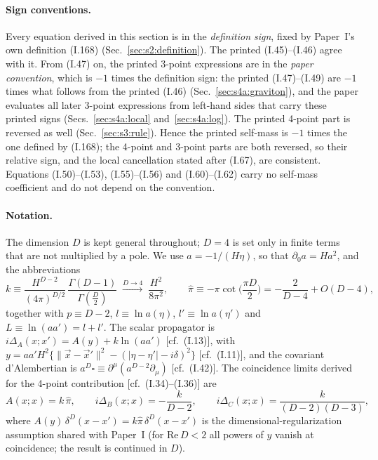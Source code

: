 \documentclass[aps,prd,onecolumn,10pt,nofootinbib,floatfix]{revtex4-2}
\newcommand{\PI}{Paper~I}
\newcommand{\eqI}[1]{(I.#1)}
\newcommand{\pihat}{\hat\pi}
\begin{document}
\paragraph*{Sign conventions.}
Every equation derived in this section is in the \emph{definition sign}, fixed by \PI's own definition
\eqI{168} (Sec.~\ref{sec:s2:definition}). The printed \eqI{45}--\eqI{46} agree with it. From \eqI{47} on,
the printed 3-point expressions are in the \emph{paper convention}, which is $-1$ times the definition
sign: the printed \eqI{47}--\eqI{49} are $-1$ times what follows from the printed \eqI{46}
(Sec.~\ref{sec:s4a:graviton}), and the paper evaluates all later 3-point expressions from left-hand
sides that carry these printed signs (Secs.~\ref{sec:s4a:local} and~\ref{sec:s4a:log}). The printed
4-point part is reversed as well (Sec.~\ref{sec:s3:rule}). Hence the printed self-mass is $-1$ times the
one defined by \eqI{168}; the 4-point and 3-point parts are both reversed, so their relative sign,
and the local cancellation stated after \eqI{67}, are consistent.
Equations \eqI{50}--\eqI{53}, \eqI{55}--\eqI{56} and \eqI{60}--\eqI{62} carry no self-mass
coefficient and do not depend on the convention.

\paragraph*{Notation.}
The dimension $D$ is kept general throughout; $D=4$ is set only in finite terms that are not multiplied by a pole.
We use $a=-1/(H\eta)$, so that $\partial_0a=Ha^2$, and the abbreviations
\begin{equation}
k\equiv\frac{H^{D-2}}{(4\pi)^{D/2}}\,\frac{\Gamma(D-1)}{\Gamma(\frac D2)}\;\xrightarrow{D\to4}\;\frac{H^2}{8\pi^2},
\qquad
\pihat\equiv-\pi\cot\Big(\frac{\pi D}{2}\Big)=-\frac{2}{D-4}+O(D-4),
\label{eq:s4a:kpi}
\end{equation}
together with $p\equiv D-2$, $l\equiv\ln a(\eta)$, $l'\equiv\ln a(\eta')$ and $L\equiv\ln(aa')=l+l'$.
The scalar propagator is $i\Delta_A(x;x')=A(y)+k\ln(aa')$ [cf.\ \eqI{13}], with
$y=aa'H^2\{\|\vec x-\vec x'\|^2-(|\eta-\eta'|-i\delta)^2\}$ [cf.\ \eqI{11}], and the covariant
d'Alembertian is $a^D\square\equiv\partial^\mu(a^{D-2}\partial_\mu)$ [cf.\ \eqI{42}].
The coincidence limits derived for the 4-point contribution [cf.\ \eqI{34}--\eqI{36}] are
\begin{equation}
A(x;x)=k\,\pihat,\qquad i\Delta_B(x;x)=-\frac{k}{D-2},\qquad i\Delta_C(x;x)=\frac{k}{(D-2)(D-3)},
\label{eq:s4a:coinc}
\end{equation}
where $A(y)\,\delta^D(x-x')=k\pihat\,\delta^D(x-x')$ is the dimensional-regularization assumption
shared with \PI{} (for $\mathrm{Re}\,D<2$ all powers of $y$ vanish at coincidence; the result is
continued in $D$).
\end{document}
